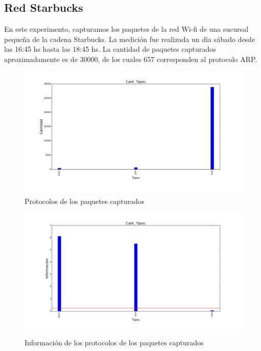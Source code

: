 \subsection{Red Starbucks}

En este experimento, capturamos los paquetes de la red Wi-fi de una sucursal pequeña de la cadena Starbucks. La medición fue realizada un día sábado desde las 16:45 hs hasta las 18:45 hs. La cantidad de paquetes capturados aproximadamente es de 30000, de los cuales 657 corresponden al protocolo ARP.

\begin{figure}[H]
       \centering
       \includegraphics[width=1\textwidth]{../resultados/Starbucks/histogram_types.png}
       \caption{Protocolos de los paquetes capturados}
       \label{red-Starbucks-types}
\end{figure}

\begin{figure}[H]
       \centering
       \includegraphics[width=1\textwidth]{../resultados/Starbucks/histogram_types_information.png}
       \caption{Información de los protocolos de los paquetes capturados}
       \label{red-Starbucks-types-information}
\end{figure}

